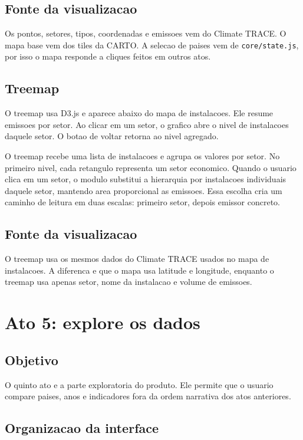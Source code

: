 \documentclass[12pt,a4paper]{article}
\begin{document}
\subsection{Fonte da visualizacao}

Os pontos, setores, tipos, coordenadas e emissoes vem do Climate TRACE. O mapa base vem dos tiles da CARTO. A selecao de paises vem de \texttt{core/state.js}, por isso o mapa responde a cliques feitos em outros atos.

\subsection{Treemap}

O treemap usa D3.js e aparece abaixo do mapa de instalacoes. Ele resume emissoes por setor. Ao clicar em um setor, o grafico abre o nivel de instalacoes daquele setor. O botao de voltar retorna ao nivel agregado.

O treemap recebe uma lista de instalacoes e agrupa os valores por setor. No primeiro nivel, cada retangulo representa um setor economico. Quando o usuario clica em um setor, o modulo substitui a hierarquia por instalacoes individuais daquele setor, mantendo area proporcional as emissoes. Essa escolha cria um caminho de leitura em duas escalas: primeiro setor, depois emissor concreto.

\subsection{Fonte da visualizacao}

O treemap usa os mesmos dados do Climate TRACE usados no mapa de instalacoes. A diferenca e que o mapa usa latitude e longitude, enquanto o treemap usa apenas setor, nome da instalacao e volume de emissoes.

\section{Ato 5: explore os dados}

\subsection{Objetivo}

O quinto ato e a parte exploratoria do produto. Ele permite que o usuario compare paises, anos e indicadores fora da ordem narrativa dos atos anteriores.

\subsection{Organizacao da interface}
\end{document}
